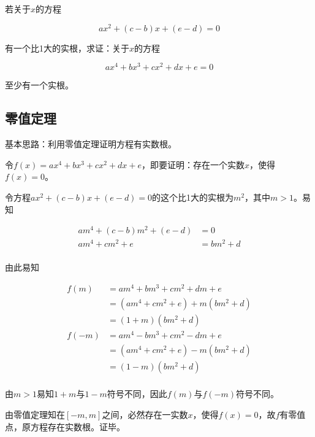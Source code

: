 

若关于$x$的方程

\[ ax^2 + (c - b)x + (e - d) = 0 \]

有一个比1大的实根，求证：关于$x$的方程

\[ ax^4 + bx^3 + cx^2 + dx + e = 0 \]

至少有一个实根。

\subsection{零值定理}

基本思路：利用零值定理证明方程有实数根。

令$f(x) = ax^4 + bx^3 + cx^2 + dx + e$，即要证明：存在一个实数$x$，使得$f(x) = 0$。

令方程$ax^2 + (c - b)x + (e - d) = 0$的这个比1大的实根为$m^2$，其中$m > 1$。易知

\begin{align*}
  am^4 + (c - b)m^2 + (e - d) &= 0 \\
  am^4 + cm^2 + e &= bm^2 + d \\
\end{align*}

由此易知

\begin{align*}
  f(m) &= am^4 + bm^3 + cm^2 + dm + e \\
  &= (am^4 + cm^2 + e) + m(bm^2 + d) \\
  &= (1 + m)(bm^2 + d) \\
  f(-m) &= am^4 - bm^3 + cm^2 - dm + e \\
  &= (am^4 + cm^2 + e) - m(bm^2 + d) \\
  &= (1 - m)(bm^2 + d) \\
\end{align*}

由$m > 1$易知$1 + m$与$1 - m$符号不同，因此$f(m)$与$f(-m)$符号不同。

由零值定理知在$[-m, m]$之间，必然存在一实数$x$，使得$f(x) = 0$，故$f$有零值点，原方程存在实数根。证毕。
